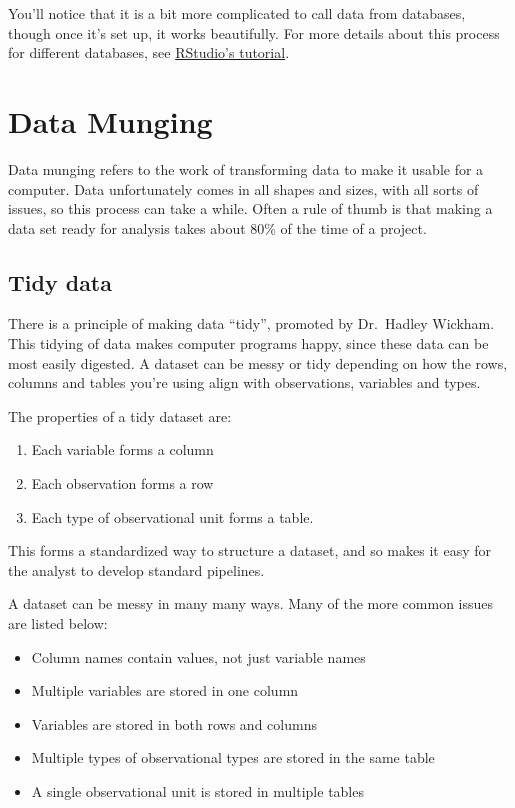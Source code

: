 \documentclass[12pt,letterpaperpaper,openany]{book}
\providecommand{\tightlist}{%
  \setlength{\itemsep}{0pt}\setlength{\parskip}{0pt}}
\begin{document}
You'll notice that it is a bit more complicated to call data from databases, though
once it's set up, it works beautifully. For more details about this process for different
databases, see \href{https://db.rstudio.com/}{RStudio's tutorial}.

\hypertarget{sec:data-munging}{%
\chapter{Data Munging}\label{sec:data-munging}}

Data munging refers to the work of transforming data to make it usable for a computer.
Data unfortunately comes in all shapes and sizes, with all sorts of issues, so this
process can take a while. Often a rule of thumb is that making a data set ready for
analysis takes about 80\% of the time of a project.

\hypertarget{tidy-data}{%
\section{Tidy data}\label{tidy-data}}

There is a principle of making data ``tidy'', promoted by Dr.~Hadley Wickham. This
tidying of data makes computer programs happy, since these data can be most
easily digested. A dataset can be messy or tidy depending on how the rows, columns and tables you're
using align with observations, variables and types.

The properties of a tidy dataset are:

\begin{enumerate}
\def\labelenumi{\arabic{enumi}.}
\tightlist
\item
  Each variable forms a column
\item
  Each observation forms a row
\item
  Each type of observational unit forms a table.
\end{enumerate}

This forms a standardized way to structure a dataset, and so makes it easy for the
analyst to develop standard pipelines.

A dataset can be messy in many many ways. Many of the more common issues are listed below:

\begin{itemize}
\tightlist
\item
  Column names contain values, not just variable names
\item
  Multiple variables are stored in one column
\item
  Variables are stored in both rows and columns
\item
  Multiple types of observational types are stored in the same table
\item
  A single observational unit is stored in multiple tables
\end{itemize}
\end{document}
